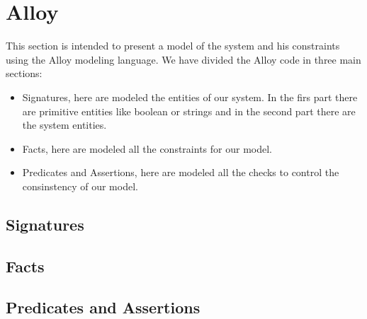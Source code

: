 \section{Alloy}
	This section is intended to present a model of the system and his constraints using the Alloy modeling language. We have divided the Alloy code in three main sections:
		\begin{itemize}
			\item Signatures, here are modeled the entities of our system. In the firs part there are primitive entities like boolean or strings and in the second part there are the system entities.
			\item Facts, here are modeled all the constraints for our model.
			\item Predicates and Assertions, here are modeled all the checks to control the consinstency of our model.
		\end{itemize}

		\subsection{Signatures}

		\subsection{Facts}

		\subsection{Predicates and Assertions}